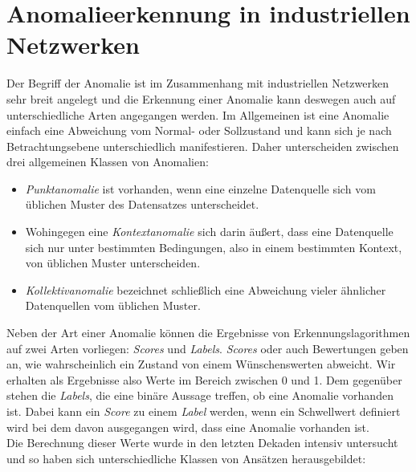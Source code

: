 \section{Anomalieerkennung in industriellen Netzwerken}
Der Begriff der Anomalie ist im Zusammenhang mit industriellen Netzwerken sehr breit angelegt und die Erkennung einer Anomalie kann deswegen auch auf unterschiedliche Arten angegangen werden. Im Allgemeinen ist eine Anomalie einfach eine Abweichung vom Normal- oder Sollzustand und kann sich je nach Betrachtungsebene unterschiedlich manifestieren. Daher unterscheiden \citet{ahmed2016survey} zwischen drei allgemeinen Klassen von Anomalien:
\begin{itemize}
\item \textit{Punktanomalie} ist vorhanden, wenn eine einzelne Datenquelle sich vom üblichen Muster des Datensatzes unterscheidet.
\item Wohingegen eine \textit{Kontextanomalie} sich darin äußert, dass eine Datenquelle sich nur unter bestimmten Bedingungen, also in einem bestimmten Kontext, von üblichen Muster unterscheiden.
\item \textit{Kollektivanomalie} bezeichnet schließlich eine Abweichung vieler ähnlicher Datenquellen vom üblichen Muster.
\end{itemize}
Neben der Art einer Anomalie können die Ergebnisse von Erkennungslagorithmen auf zwei Arten vorliegen: \textit{Scores} und \textit{Labels}. \textit{Scores} oder auch Bewertungen geben an, wie wahrscheinlich ein Zustand von einem Wünschenswerten abweicht. Wir erhalten als Ergebnisse also Werte im Bereich zwischen 0 und 1. Dem gegenüber stehen die \textit{Labels}, die eine binäre Aussage treffen, ob eine Anomalie vorhanden ist. Dabei kann ein \textit{Score} zu einem \textit{Label} werden, wenn ein Schwellwert definiert wird bei dem davon ausgegangen wird, dass eine Anomalie vorhanden ist. \cite[p. ~22]{ahmed2016survey}\\
Die Berechnung dieser Werte wurde in den letzten Dekaden intensiv untersucht und so haben sich unterschiedliche Klassen von Ansätzen herausgebildet:
\TODO
